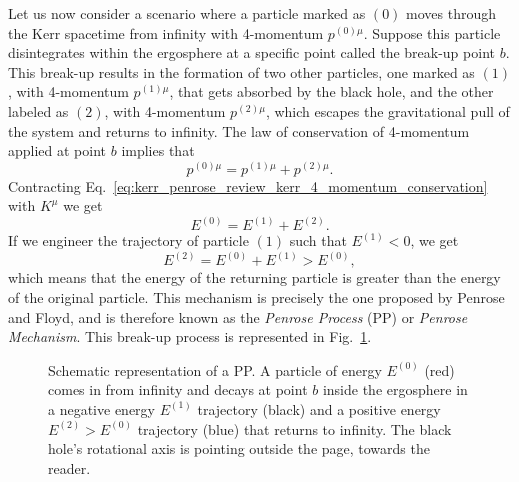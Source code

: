 Let us now consider a scenario where a particle marked as $(0)$ moves through the Kerr spacetime from infinity with 4-momentum $p^{(0)\mu}$. Suppose this particle disintegrates within the ergosphere at a specific point called the break-up point $b$. This break-up results in the formation of two other particles, one marked as $(1)$, with 4-momentum $p^{(1)\mu}$, that gets absorbed by the black hole, and the other labeled as $(2)$, with 4-momentum $p^{(2)\mu}$, which escapes the gravitational pull of the system and returns to infinity. The law of conservation of 4-momentum applied at point $b$ implies that
%
\begin{equation}
  p^{(0)\mu} = p^{(1)\mu} + p^{(2)\mu}.
  \label{eq:kerr_penrose_review_kerr_4_momentum_conservation}
\end{equation}
%
Contracting Eq.~\eqref{eq:kerr_penrose_review_kerr_4_momentum_conservation} with $K^\mu$ we get
\begin{equation}
  E^{(0)} = E^{(1)} + E^{(2)}.
  \label{eq:kerr_penrose_review_kerr_energy_conservation}
\end{equation}
%
If we engineer the trajectory of particle $(1)$ such that $E^{(1)} < 0$, we get
\begin{equation}
  E^{(2)} = E^{(0)} + E^{(1)} > E^{(0)},
  \label{eq:kerr_penrose_review_kerr_energy_increase}
\end{equation}
%
which means that the energy of the returning particle is greater than the energy of the original particle. This mechanism is precisely the one proposed by Penrose and Floyd, and is therefore known as the \emph{Penrose Process} (PP) or \emph{Penrose Mechanism}. This break-up process is represented in Fig.~\ref{fig:kerr_penrose_review_kerr_breakup}.

\begin{figure}[!ht]
  \centering
  
  \caption{Schematic representation of a PP. A particle of energy $E^{(0)}$ (red) comes in from infinity and decays at point $b$ inside the ergosphere in a negative energy $E^{(1)}$ trajectory (black) and a positive energy $E^{(2)}>E^{(0)}$ trajectory (blue) that returns to infinity. The black hole's rotational axis is pointing outside the page, towards the reader.}
  \label{fig:kerr_penrose_review_kerr_breakup}
\end{figure}

